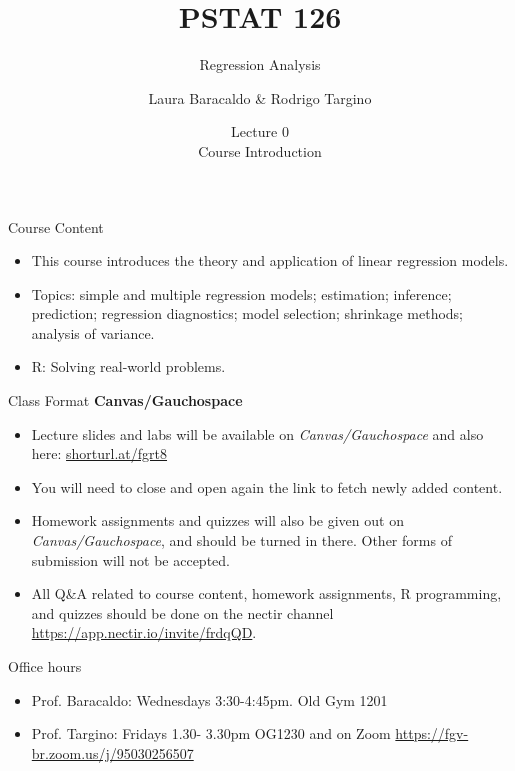\documentclass[10pt]{beamer}
\title[PSTAT 126: Regression Analysis]{PSTAT 126}%
\subtitle{Regression Analysis }%
\author[Laura Baracaldo \& Rodrigo Targino]{Laura Baracaldo \& Rodrigo Targino}%
\institute[UCSB]{}
\date[\textcolor{white}{Lecure 0: Course Introduction}]
{Lecture 0\\
Course Introduction}
\begin{document}
\frame{\titlepage}






\begin{frame}{Course Content}

\begin{itemize}
\large
    \item This course introduces the theory and application of linear regression models. 
    \item Topics: simple and multiple regression models; estimation; inference; prediction; regression diagnostics; model selection; shrinkage methods; analysis of variance. \item R: Solving real-world problems.
\end{itemize}

\end{frame}



\begin{frame}{Class Format}
\large
{\bf Canvas/Gauchospace}
\begin{itemize}

\item Lecture slides and labs will be available on {\em Canvas/Gauchospace} and also here:
\url{shorturl.at/fgrt8}
\item You will need to close and open again the link to fetch newly added content.
\item Homework assignments and quizzes will also be given out on {\em Canvas/Gauchospace}, and should be turned in there. Other forms of submission will not be accepted.
\item All Q\&A related to course content, homework assignments, R programming, and quizzes should
be done on the nectir channel \url{https://app.nectir.io/invite/frdqQD}.
\end{itemize}
\end{frame}

\begin{frame}{Office hours}
	\large
	\begin{itemize}
		\item Prof. Baracaldo: Wednesdays 3:30-4:45pm. Old Gym 1201
		\item Prof. Targino: Fridays 1.30- 3.30pm OG1230 and on Zoom \url{https://fgv-br.zoom.us/j/95030256507}
	\end{itemize}
\end{frame}
\end{document}
